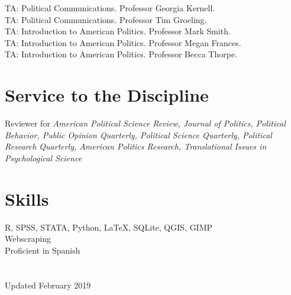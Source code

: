 \documentclass[11pt, a4paper]{article}
\newcommand{\years}[1]{\marginnote{\scriptsize #1}}
\begin{document}
\years{2018} TA: Political Communications. Professor Georgia Kernell.\\
\years{} TA: Political Communications. Professor Tim Groeling.\\
\years{2015} TA: Introduction to American Politics. Professor Mark Smith.\\
\years{} TA: Introduction to American Politics. Professor Megan Frances.\\
\years{2014} TA: Introduction to American Politics. Professor Becca Thorpe.

\section*{Service to the Discipline}

Reviewer for \textit{American Political Science Review, Journal of Politics, Political Behavior, Public Opinion Quarterly, Political Science Quarterly, Political Research Quarterly, American Politics Research, Translational Issues in Psychological Science}

\section*{Skills}

R, SPSS, STATA, Python, \LaTeX, SQLite, QGIS, GIMP\\
Webscraping\\
Proficient in Spanish\\
\\
\\
Updated February 2019
\end{document}
